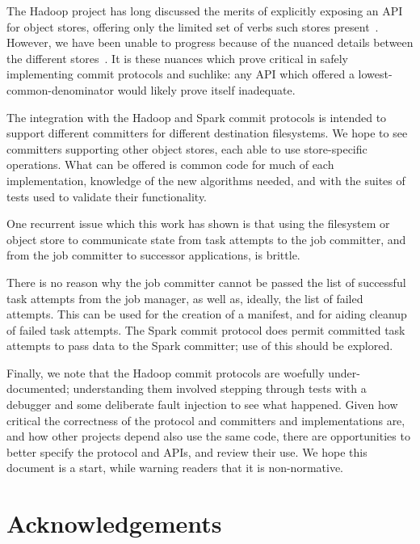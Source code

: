\documentclass[conference]{IEEEtran}
\begin{document}
The Hadoop project has long discussed the merits of explicitly
exposing an API for object stores, offering only the limited
set of verbs such stores present\ \cite{HADOOP-9565}.
However, we have been unable to progress because of the nuanced details
between the different stores\ \cite{S3, WASB, ADL, GCS}.
It is these nuances which prove critical in safely implementing
commit protocols and suchlike: any API which offered a lowest-common-denominator
would likely prove itself inadequate.

The integration with the Hadoop and Spark commit protocols is intended
to support different committers for different destination filesystems.
We hope to see committers supporting other object stores, each
able to use store-specific operations.
What can be offered is common code for much of each implementation,
knowledge of the new algorithms needed, and
with the suites of tests used to validate their functionality.

One recurrent issue which this work has shown is that using the
filesystem or object store to communicate state from task attempts
to the job committer, and from the job committer to successor
applications, is brittle.

There is no reason why the job committer cannot be passed the list of
successful task attempts from the job manager, as well as, ideally,
the list of failed attempts.
This can be used for the creation of a manifest, and for aiding cleanup
of failed task attempts.
The Spark commit protocol does permit committed task attempts to pass data
to the Spark committer;
use of this should be explored.


Finally, we note that the Hadoop commit protocols are woefully under-documented;
understanding them involved stepping through tests with a debugger and
some deliberate fault injection to see what happened.
Given how critical the correctness of the protocol and committers and implementations
are, and how other projects depend also use the same code, there
are opportunities to better specify the protocol and APIs, and review
their use.
We hope this document is a start, while warning readers that it is non-normative.


\section*{Acknowledgements}
\label{sec:acknowledgements}
\end{document}
